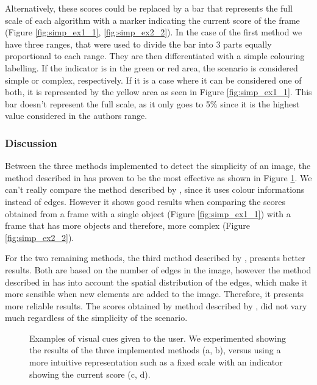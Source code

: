 Alternatively, these scores could be replaced by a bar that represents the full scale of each algorithm with a marker indicating the current score of the frame (Figure \ref{fig:simp_ex1_1}, \ref{fig:simp_ex2_2}).
In the case of the first method \cite{luo2008photo} we have three ranges, that were used to divide the bar into 3 parts equally proportional to each range. They are then differentiated with a simple colouring labelling. If the indicator is in the green or red area, the scenario is considered simple or complex, respectively. If it is a case where it can be considered one of both, it is represented by the yellow area as seen in Figure \ref{fig:simp_ex1_1}. This bar doesn't represent the full scale, as it only goes to 5\% since it is the highest value considered in the authors range.

\subsubsection{Discussion}
Between the three methods implemented to detect the simplicity of an image, the method described in \cite{ke2006design} has proven to be the most effective as shown in Figure \ref{fig:simp_ex}. We can't really compare the method described by \citeauthor{luo2008photo} \cite{luo2008photo}, since it uses colour informations instead of edges. However it shows good results when comparing the scores obtained from a frame with a single object (Figure \ref{fig:simp_ex1_1}) with a frame that has more objects and therefore, more complex (Figure \ref{fig:simp_ex2_2}).

For the two remaining methods, the third method described by \citeauthor{ke2006design}, presents better results. Both are based on the number of edges in the image, however the method described in \cite{ke2006design} has into account the spatial distribution of the edges, which make it more sensible when new elements are added to the image. Therefore, it presents more reliable results. The scores obtained by method described by \citeauthor{kaoautomatic} \cite{kaoautomatic}, did not vary much regardless of the simplicity of the scenario.

\begin{figure}[htb]
	\centering
  	\caption{Examples of visual cues given to the user. We experimented showing the results of the three implemented methods (a, b), versus using a more intuitive representation such as a fixed scale with an indicator showing the current score (c, d).}
	\label{fig:simp_ex}
\end{figure}

